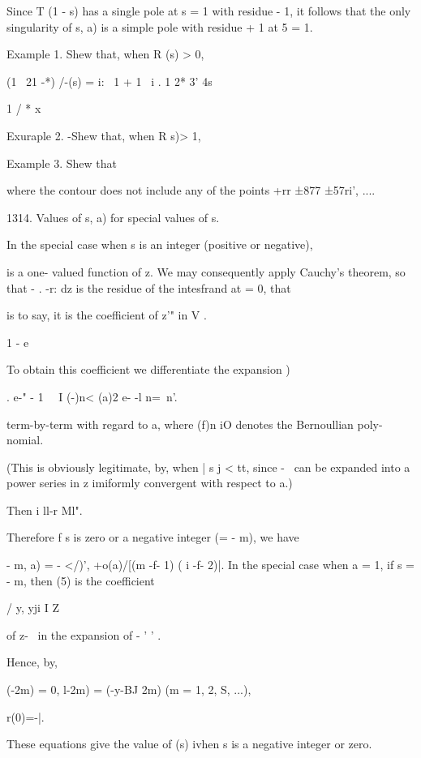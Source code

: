 Since T (1 - s) has a single pole at s = 1 with residue - 1, it
follows that the only singularity of s, a) is a simple pole with
residue + 1 at 5 = 1.

Example 1. Shew that, when R (s) > 0,

(1 \ 21 -*) /-(s) = i: \ 1 + 1 \ i . 1 2* 3' 4s ~

1 / * x ~

Exuraple 2. -Shew that, when R s)> 1,

Example 3. Shew that

where the contour does not include any of the points +rr ±877 ±57ri',
....

1314. Values of s, a) for special values of s.

In the special case when s is an integer (positive or negative),

is a one- valued function of z. We may consequently apply Cauchy's
theorem, so that - . -r: dz is the residue of the intesfrand at = 0,
that

is to say, it is the coefficient of z'" in V .

1 - e~

To obtain this coefficient we differentiate the expansion )

. e-" - 1 \ \ I (-)n< (a)2 e- -l n=\ n'.

term-by-term with regard to a, where (f)n iO denotes the Bernoullian
poly- nomial.

(This is obviously legitimate, by, when | s j < tt, since - \,
can be expanded into a power series in z imiformly convergent with
respect to a.)

Then i ll-r Ml".

Therefore f s is zero or a negative integer (= - m), we have

  - m, a) = - </)', +o(a)/[(m -f- 1) ( i -f- 2)|. In the special case
when a = 1, if s = - m, then (5) is the coefficient

/ y, yji I Z

of z-~ in the expansion of - ' ' .

%
%

Hence, by,

 (-2m) = 0, l-2m) = (-y-BJ 2m) (m = 1, 2, S, ...),

r(0)=-|.

These equations give the value of (s) ivhen s is a negative integer or
zero.



